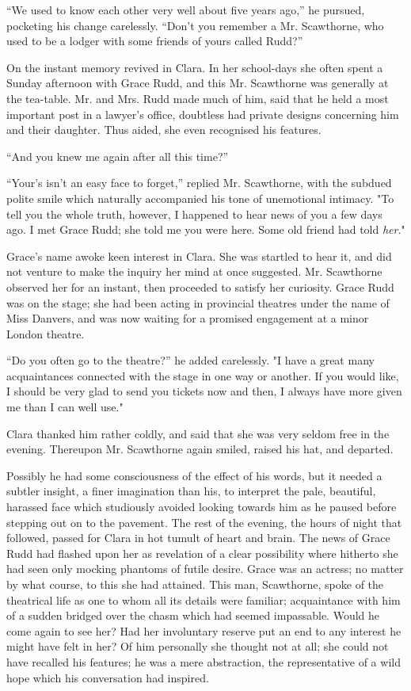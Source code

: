``We used to know each other very well about five years ago,'' he
pursued, pocketing his change carelessly. ``Don't you remember a Mr.
Scawthorne, who used to be a lodger with some friends of yours called
Rudd?''

On the instant memory revived in Clara. In her school-days she often
spent a Sunday afternoon with Grace Rudd, and this Mr. Scawthorne was
generally at the tea-table. Mr. and Mrs. Rudd made much of him, said
that he held a most important post in a lawyer's office, doubtless had
private designs concerning him and their daughter. Thus aided, she even
recognised his features.

{}``And you knew me again after all this time?''

``Your's isn't an easy face to forget,'' replied Mr. Scawthorne, with
the subdued polite smile which naturally accompanied his tone of
unemotional intimacy. "To tell you the whole truth, however, I happened
to hear news of you a few days ago. I met Grace Rudd; she told me you
were here. Some old friend had told \emph{her}."

Grace's name awoke keen interest in Clara. She was startled to hear it,
and did not venture to make the inquiry her mind at once suggested. Mr.
Scawthorne observed her for an instant, then proceeded to satisfy her
curiosity. Grace Rudd was on the stage; she had been acting in
provincial theatres under the name of Miss Danvers, and was now waiting
for a promised engagement at a minor London theatre.

``Do you often go to the theatre?'' he added carelessly. "I have a great
many acquaintances connected with the stage in one way or another. If
you would like, I should be {}very glad to send you tickets now and
then, I always have more given me than I can well use."

Clara thanked him rather coldly, and said that she was very seldom free
in the evening. Thereupon Mr. Scawthorne again smiled, raised his hat,
and departed.

Possibly he had some consciousness of the effect of his words, but it
needed a subtler insight, a finer imagination than his, to interpret the
pale, beautiful, harassed face which studiously avoided looking towards
him as he paused before stepping out on to the pavement. The rest of the
evening, the hours of night that followed, passed for Clara in hot
tumult of heart and brain. The news of Grace Rudd had flashed upon her
as revelation of a clear possibility where hitherto she had seen only
mocking phantoms of futile desire. Grace was an actress; no matter by
what course, to this she had attained. This man, Scawthorne, spoke of
the theatrical life as one to whom all its details were familiar;
acquaintance with him of a sudden bridged over the {}chasm which had
seemed impassable. Would he come again to see her? Had her involuntary
reserve put an end to any interest he might have felt in her? Of him
personally she thought not at all; she could not have recalled his
features; he was a mere abstraction, the representative of a wild hope
which his conversation had inspired.

